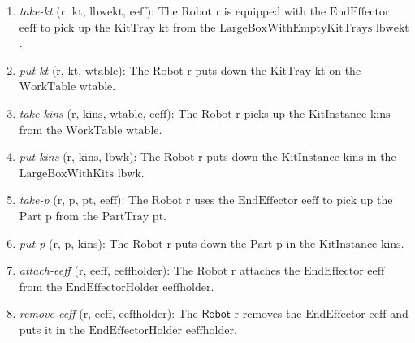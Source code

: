 \documentclass[a4paper, 10pt, conference]{ieeeconf}      %
\begin{document}
\begin{enumerate}
\item \textsl{take-kt} ($\mathrm{r}$, $\mathrm{kt}$, $\mathrm{lbwekt}$, $\mathrm{eeff}$): The $\mathrm{Robot}$ $\mathrm{r}$ is equipped with the $\mathrm{EndEffector}$ $\mathrm{eeff}$ to pick up the $\mathrm{KitTray}$ $\mathrm{kt}$ from the $\mathrm{LargeBoxWithEmptyKitTrays}$ $\mathrm{lbwekt}$.

\item \textsl{put-kt} ($\mathrm{r}$, $\mathrm{kt}$, $\mathrm{wtable}$): The $\mathrm{Robot}$ $\mathrm{r}$ puts down the $\mathrm{KitTray}$ $\mathrm{kt}$ on the $\mathrm{WorkTable}$ $\mathrm{wtable}$.

\item \textsl{take-kins} ($\mathrm{r}$, $\mathrm{kins}$, $\mathrm{wtable}$, $\mathrm{eeff}$): The $\mathrm{Robot}$ $\mathrm{r}$ picks up the $\mathrm{KitInstance}$ $\mathrm{kins}$ from the $\mathrm{WorkTable}$ $\mathrm{wtable}$.

\item \textsl{put-kins} ($\mathrm{r}$, $\mathrm{kins}$, $\mathrm{lbwk}$): The $\mathrm{Robot}$ $\mathrm{r}$ puts down the $\mathrm{KitInstance}$ $\mathrm{kins}$ in the $\mathrm{LargeBoxWithKits}$ $\mathrm{lbwk}$.

\item \textsl{take-p} ($\mathrm{r}$, $\mathrm{p}$, $\mathrm{pt}$, $\mathrm{eeff}$): The $\mathrm{Robot}$ $\mathrm{r}$ uses the $\mathrm{EndEffector}$ $\mathrm{eeff}$ to pick up the $\mathrm{Part}$ $\mathrm{p}$ from the $\mathrm{PartTray}$ $\mathrm{pt}$.

\item \textsl{put-p} ($\mathrm{r}$, $\mathrm{p}$, $\mathrm{kins}$): The $\mathrm{Robot}$ $\mathrm{r}$ puts down the $\mathrm{Part}$ $\mathrm{p}$ in the $\mathrm{KitInstance}$ $\mathrm{kins}$.

\item \textsl{attach-eeff} ($\mathrm{r}$, $\mathrm{eeff}$, $\mathrm{eeffholder}$): The $\mathrm{Robot}$ $\mathrm{r}$ attaches the $\mathrm{EndEffector}$ $\mathrm{eeff}$ from the $\mathrm{EndEffectorHolder}$ $\mathrm{eeffholder}$.

\item \textsl{remove-eeff} ($\mathrm{r}$, $\mathrm{eeff}$, $\mathrm{eeffholder}$): The $\mathsf{Robot}$ $\mathrm{r}$ removes the $\mathrm{EndEffector}$ $\mathrm{eeff}$ and puts it in the $\mathrm{EndEffectorHolder}$ $\mathrm{eeffholder}$.
\end{enumerate}
\end{document}
